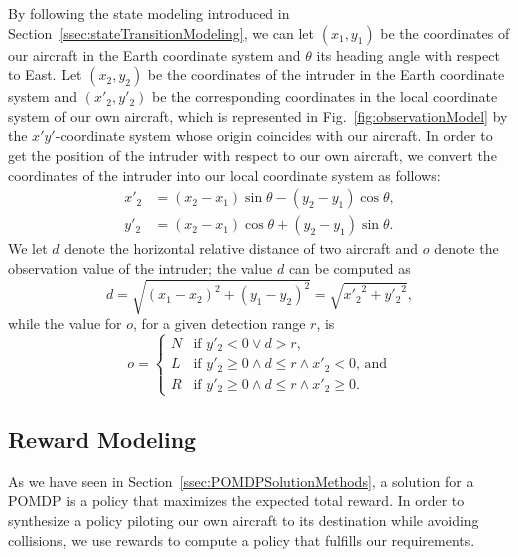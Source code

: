 \documentclass{article}
\begin{document}
By following the state modeling introduced in Section~\ref{ssec:stateTransitionModeling}, we can let $(x_{1},y_{1})$ be the coordinates of our aircraft in the Earth coordinate system and $\theta$ its heading angle with respect to East.
Let $(x_{2},y_{2})$ be the coordinates of the intruder in the Earth coordinate system and $(x'_{2},y'_{2})$ be the corresponding coordinates in the local coordinate system of our own aircraft, which is represented in Fig.~\ref{fig:observationModel} by the $x'y'$-coordinate system whose origin coincides with our aircraft.
In order to get the position of the intruder with respect to our own aircraft, we convert the coordinates of the intruder into our local coordinate system as follows:
\begin{equation}
\label{eq:convert}
\begin{split}
    x'_{2} &= (x_{2}-x_{1}) \sin\theta - (y_{2}-y_{1}) \cos\theta,  \\
    y'_{2} &= (x_{2}-x_{1}) \cos\theta + (y_{2}-y_{1}) \sin\theta.
\end{split}
\end{equation}
We let $d$ denote the horizontal relative distance of two aircraft and $o$ denote the observation value of the intruder;
the value $d$ can be computed as
\begin{equation}
	\label{eq:distance}
    d = \sqrt{(x_{1}-x_{2})^{2} + (y_{1}-y_{2})^{2}} = \sqrt{{x'_{2}}^{2} + {y'_{2}}^{2}},
\end{equation}
while the value for $o$, for a given detection range $r$, is
\begin{equation} 
	o = 
	\begin{cases}
		N & \text{if $y'_{2} < 0 \lor d > r$,} \\
		L & \text{if $y'_{2} \geq 0 \land d \leq r \land x'_{2} < 0$, and} \\
		R & \text{if $y'_{2} \geq 0 \land d \leq r \land x'_{2} \geq 0$.}
	\end{cases}
\end{equation}


\subsection{Reward Modeling}
\label{ssec:rewardModeling}

As we have seen in Section~\ref{ssec:POMDPSolutionMethods}, a solution for a POMDP is a policy that maximizes the expected total reward.
In order to synthesize a policy piloting our own aircraft to its destination while avoiding collisions, we use rewards to compute a policy that fulfills our requirements.
\end{document}
